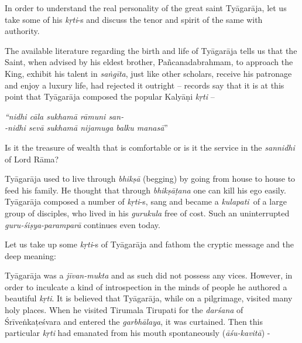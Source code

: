 In order to understand the real personality of the great saint Tyāgarāja, let us take some of his \textit{kṛti}-s and discuss the tenor and spirit of the same with authority.

The available literature regarding the birth and life of Tyāgarāja tells us that the Saint, when advised by his eldest brother, Pañcanadabrahmam, to approach the King, exhibit his talent in \textit{saṅgīta}, just like other scholars, receive his patronage and enjoy a luxury life, had rejected it outright – records say that it is at this point that Tyāgarāja composed the popular Kalyāṇi \textit{kṛti} –

\begin{longquote}
\textit{“nidhi cāla sukhamā rāmuni san-}\\ \textit{-nidhi sevā sukhamā nijamuga balku manasā}”
\end{longquote}

Is it the treasure of wealth that is comfortable or is it the service in the \textit{sannidhi} of Lord Rāma?

Tyāgarāja used to live through \textit{bhikṣā} (begging) by going from house to house to feed his family. He thought that through \textit{bhikṣāṭana} one can kill his ego easily. Tyāgarāja composed a number of \textit{kṛti}-s, sang and became a \textit{kulapati} of a large group of disciples, who lived in his \textit{gurukula} free of cost. Such an uninterrupted \textit{guru-śiṣya-paramparā} continues even today. 

Let us take up some \textit{kṛti}-s of Tyāgarāja and fathom the cryptic message and the deep meaning: 

Tyāgarāja was a \textit{jīvan-mukta} and as such did not possess any vices. However, in order to inculcate a kind of introspection in the minds of people he authored a beautiful \textit{kṛti}. It is believed that Tyāgarāja, while on a pilgrimage, visited many holy places. When he visited Tirumala Tirupati for the \textit{darśana} of Śrīveṅkaṭeśvara and entered the \textit{garbhālaya}, it was curtained. Then this particular \textit{kṛti} had emanated from his mouth spontaneously (\textit{āśu-kavitā}) -

